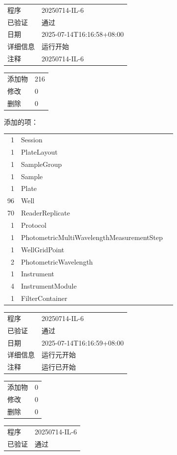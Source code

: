 \documentclass[UTF8,10pt,a4paper,fontset=fandol]{ctexart}
\begin{document}
\begin{flushleft}
\scriptsize
\begin{tabular}{ll}
程序 & 20250714-IL-6\\
已验证 & 通过\\
日期 & 2025-07-14T16:16:58+08:00\\
详细信息 & 运行开始\\
注释 & 20250714-IL-6
\end{tabular}

\vspace{0.5em}

\begin{tabular}{ll}
添加物 & 216\\
修改 & 0\\
删除 & 0
\end{tabular}

\vspace{0.5em}

添加的项：
\begin{tabular}{rll}
1 & Session\\
1 & PlateLayout\\
1 & SampleGroup\\
1 & Sample\\
1 & Plate\\
96 & Well\\
70 & ReaderReplicate\\
1 & Protocol\\
1 & PhotometricMultiWavelengthMeasurementStep\\
1 & WellGridPoint\\
2 & PhotometricWavelength\\
1 & Instrument\\
4 & InstrumentModule\\
1 & FilterContainer
\end{tabular}

\vspace{0.8em}

\begin{tabular}{ll}
程序 & 20250714-IL-6\\
已验证 & 通过\\
日期 & 2025-07-14T16:16:59+08:00\\
详细信息 & 运行元开始\\
注释 & 运行已开始
\end{tabular}

\vspace{0.5em}

\begin{tabular}{ll}
添加物 & 0\\
修改 & 0\\
删除 & 0
\end{tabular}

\vspace{0.8em}

\begin{tabular}{ll}
程序 & 20250714-IL-6\\
已验证 & 通过
\end{tabular}
\end{flushleft}
\end{document}
